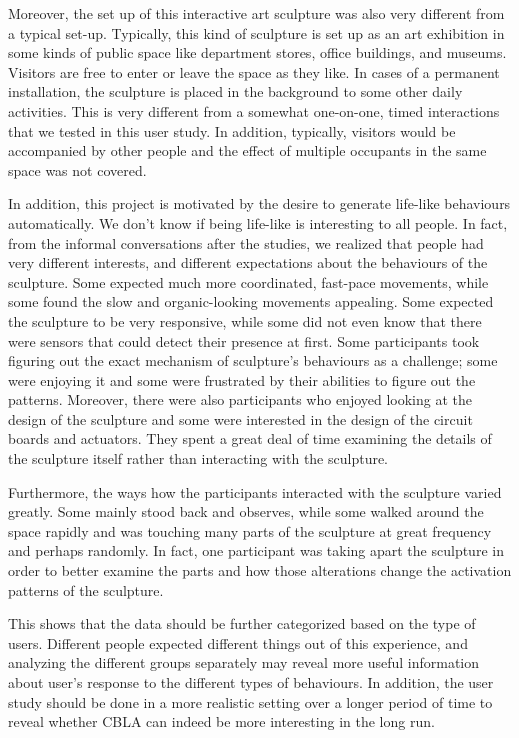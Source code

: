 Moreover, the set up of this interactive art sculpture was also very different from a typical set-up. Typically, this kind  of sculpture is set up as an art exhibition in some kinds of public space like department stores, office buildings, and museums. Visitors are free to enter or leave the space as they like. In cases of a permanent installation, the sculpture is placed in the background to some other daily activities. This is very different from a somewhat one-on-one, timed interactions that we tested in this user study. In addition, typically, visitors would be accompanied by other people and the effect of multiple occupants in the same space was not covered. 

In addition, this project is motivated by the desire to generate life-like behaviours automatically. We don't know if being life-like is interesting to all people. In fact, from the informal conversations after the studies, we realized that people had very different interests, and different expectations about the behaviours of the sculpture. Some expected much more coordinated, fast-pace movements, while some found the slow and organic-looking movements appealing. Some expected the sculpture to be very responsive, while some did not even know that there were sensors that could detect their presence at first. Some participants took figuring out the exact mechanism of sculpture's behaviours as a challenge; some were enjoying it and some were frustrated by their abilities to figure out the patterns. Moreover, there were also participants who enjoyed looking at the design of the sculpture and some were interested in the design of the circuit boards and actuators. They spent a great deal of time examining the details of the sculpture itself rather than interacting with the sculpture.

Furthermore, the ways how the participants interacted with the sculpture varied greatly. Some mainly stood back and observes, while some walked around the space rapidly and was touching many parts of the sculpture at great frequency and perhaps randomly. In fact, one participant was taking apart the sculpture in order to better examine the parts and how those alterations change the activation patterns of the sculpture. 

This shows that the data should be further categorized based on the type of users. Different people expected different things out of this experience, and analyzing the different groups separately may reveal more useful information about user's response to the different types of behaviours. In addition, the user study should be done in a more realistic setting over a longer period of time to reveal whether CBLA can indeed be more interesting in the long run.

